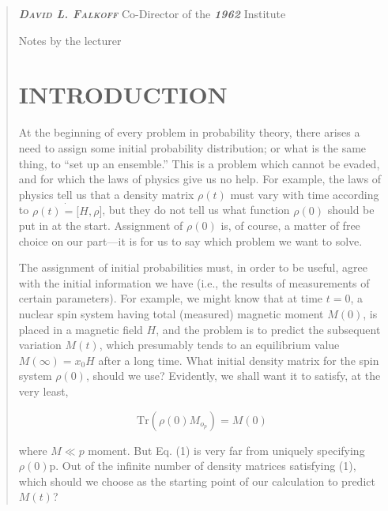 \documentclass[]{article}
\begin{document}
\begin{quote}
\emph{\textbf{\textsc{David L. Falkoff}}} Co-Director of the
\emph{\textbf{1962}} Institute

\maketitle 

Notes by the lecturer

\tableofcontents

\section{INTRODUCTION}\label{introduction}

At the beginning of every problem in probability theory, there arises a
need to assign some initial probability distribution; or what is the
same thing, to ``set up an ensemble.'' This is a problem which cannot be
evaded, and for which the laws of physics give us no help. For example,
the laws of physics tell us that a density matrix
\(\rho\left( t \right)\) must vary with time according to
\(\dot{\rho\left( t \right) = \lbrack H,\rho\rbrack}\), but they do not
tell us what function \(\rho(0)\) should be put in at the start.
Assignment of \(\rho(0)\) is, of course, a matter of free choice on our
part---it is for us to say which problem we want to solve.

The assignment of initial probabilities must, in order to be useful,
agree with the initial information we have (i.e., the results of
measurements of certain parameters). For example, we might know that at
time \(t = 0\), a nuclear spin system having total (measured) magnetic
moment \(M(0)\), is placed in a magnetic field \(H\), and the problem is
to predict the subsequent variation \(M(t)\), which presumably tends to
an equilibrium value \(M\left( \infty \right) = x_{0}H\) after a long
time. What initial density matrix for the spin system \(\rho(0)\),
should we use? Evidently, we shall want it to satisfy, at the very
least,

\[\text{Tr}\left( \rho(0)M_{o_{p}} \right) = M(0)\]

where \(M \ll p\) moment. But Eq. (1) is very far from uniquely
specifying \(\rho(0)\)p. Out of the infinite number of density matrices
satisfying (1), which should we choose as the starting point of our
calculation to predict \(M(t)\)?


\end{quote}
\end{document}
